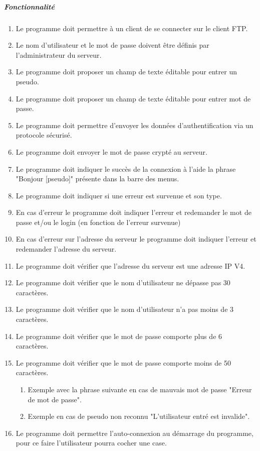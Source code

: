 \documentclass[10pt,a4paper]{report}
\begin{document}
	\subparagraph{Fonctionnalité}
	\begin{enumerate}
		\item Le programme doit permettre à un client de se connecter sur le client FTP.
		\item Le nom d'utilisateur et le mot de passe doivent être définis par l'administrateur du serveur.
		\item Le programme doit proposer un champ de texte éditable pour entrer un pseudo.
		\item Le programme doit proposer un champ de texte éditable pour entrer mot de passe.
		\item Le programme doit permettre d'envoyer les données d'authentification via un protocole sécurisé.
		\item Le programme doit envoyer le mot de passe crypté au serveur.
		\item Le programme doit indiquer le succès de la connexion à l'aide la phrase "Bonjour [pseudo]" présente dans la barre des menus.
		\item Le programme doit indiquer si une erreur est survenue et son type.
		\item En cas d'erreur le programme doit indiquer l'erreur et redemander le mot de passe et/ou le login (en fonction de l'erreur survenue)
		\item En cas d'erreur sur l'adresse du serveur le programme doit indiquer l'erreur et redemander l'adresse du serveur.
		\item Le programme doit vérifier que l'adresse du serveur est une adresse IP V4.
		\item Le programme doit vérifier que le nom d'utilisateur ne dépasse pas 30 caractères.
		\item Le programme doit vérifier que le nom d'utilisateur n'a pas moins de 3 caractères.
		\item Le programme doit vérifier que le mot de passe comporte plus de 6 caractères.
		\item Le programme doit vérifier que le mot de passe comporte moins de 50 caractères.
		\begin{enumerate}
			\item Exemple avec la phrase suivante en cas de mauvais mot de passe "Erreur de mot de passe".
			\item Exemple en cas de pseudo non reconnu "L'utilisateur entré est invalide".
		\end{enumerate}
		\item Le programme doit permettre l'auto-connexion au démarrage du programme, pour ce faire l'utilisateur pourra cocher une case.
	\end{enumerate}
\end{document}
